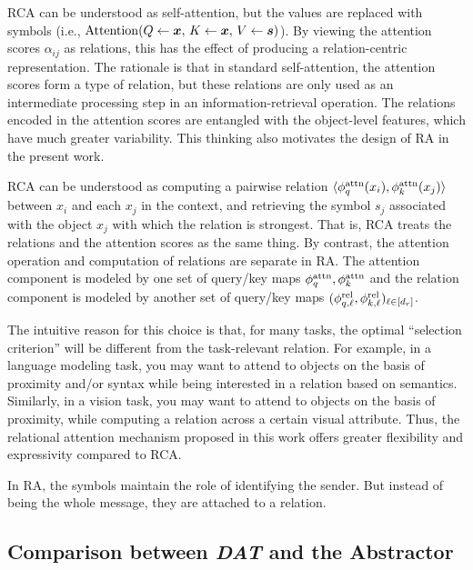 RCA can be understood as self-attention, but the values are replaced with symbols (i.e., $\mathrm{Attention}(Q \gets \bm{x},\, K \gets \bm{x},\, V \gets \bm{s})$). By viewing the attention scores $\alpha_{ij}$ as relations, this has the effect of producing a relation-centric representation. The rationale is that in standard self-attention, the attention scores form a type of relation, but these relations are only used as an intermediate processing step in an information-retrieval operation. The relations encoded in the attention scores are entangled with the object-level features, which have much greater variability. This thinking also motivates the design of RA in the present work.

RCA can be understood as computing a pairwise relation $\langle \phi_q^{\mathrm{attn}}(x_i), \phi_k^{\mathrm{attn}}(x_j) \rangle$ between $x_i$ and each $x_j$ in the context, and retrieving the symbol $s_j$ associated with the object $x_j$ with which the relation is strongest. That is, RCA treats the relations and the attention scores as the same thing. By contrast, the attention operation and computation of relations are separate in RA. The attention component is modeled by one set of query/key maps $\phi_q^{\mathrm{attn}}, \phi_k^{\mathrm{attn}}$ and the relation component is modeled by another set of query/key maps $(\phi_{q, \ell}^{\mathrm{rel}}, \phi_{k, \ell}^{\mathrm{rel}})_{\ell \in [d_r]}$.

The intuitive reason for this choice is that, for many tasks, the optimal ``selection criterion'' will be different from the task-relevant relation. For example, in a language modeling task, you may want to attend to objects on the basis of proximity and/or syntax while being interested in a relation based on semantics. Similarly, in a vision task, you may want to attend to objects on the basis of proximity, while computing a relation across a certain visual attribute. Thus, the relational attention mechanism proposed in this work offers greater flexibility and expressivity compared to RCA.

In RA, the symbols maintain the role of identifying the sender. But instead of being the whole message, they are attached to a relation.

\subsection{Comparison between \textit{DAT} and the Abstractor}

